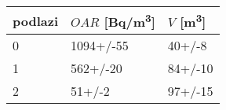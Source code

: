 \begin{tabular}{lll}
\toprule
podlazi & $OAR$ [\si{Bq/m^3}] & $V$ [\si{m^3}] \\
\midrule
0 &           1094+/-55 &         40+/-8 \\
1 &            562+/-20 &        84+/-10 \\
2 &              51+/-2 &        97+/-15 \\
\bottomrule
\end{tabular}
